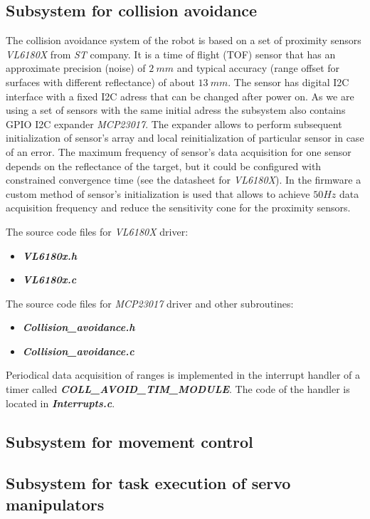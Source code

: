\documentclass[a4paper,12pt]{article} %
\begin{document}
\subsection{Subsystem for collision avoidance}
The collision avoidance system of the robot is based on a set of proximity sensors \textit{VL6180X} from \textit{ST} company. It is a time of flight (TOF) sensor that has an approximate precision (noise) of $2\:mm$ and typical accuracy (range offset for surfaces with different reflectance) of about $13\:mm$. The sensor has digital I2C interface with a fixed I2C adress that can be changed after power on. As we are using a set of sensors with the same initial adress the subsystem also contains GPIO I2C expander \textit{MCP23017}. The expander allows to perform subsequent initialization of sensor's array and local reinitialization of particular sensor in case of an error. The maximum frequency of sensor's data acquisition for one sensor depends on the reflectance of the target, but it could be configured with constrained convergence time (see the datasheet for \textit{VL6180X}). In the firmware a custom method of sensor's initialization is used that allows to achieve $50 Hz$ data acquisition frequency and reduce the sensitivity cone for the proximity sensors. 

The source code files for  \textit{VL6180X} driver:
\begin{itemize}
	\item \textbf{\textit{VL6180x.h}}
	\item \textbf{\textit{VL6180x.c}}
\end{itemize}

The source code files for  \textit{MCP23017} driver and other subroutines:
\begin{itemize}
	\item \textbf{\textit{Collision\_avoidance.h}}
	\item \textbf{\textit{Collision\_avoidance.c}}
\end{itemize}

Periodical data acquisition of ranges is implemented in the interrupt handler of a timer called \textbf{\textit{COLL\_AVOID\_TIM\_MODULE}}. The code of the handler is located in \textbf{\textit{Interrupts.c}}.

\subsection{Subsystem for movement control}


\subsection{Subsystem for task execution of servo manipulators}
\end{document}
